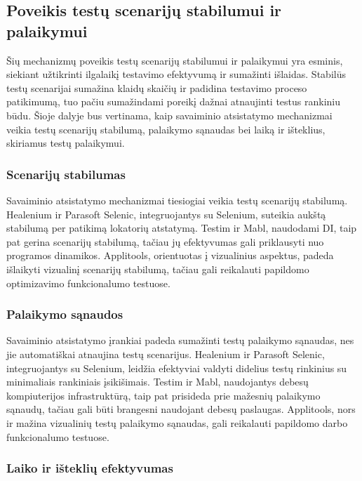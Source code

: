 \documentclass[
]{VUMIFPSkursinis}
\begin{document}
\subsection{Poveikis testų scenarijų stabilumui ir palaikymui}

Šių mechanizmų poveikis testų scenarijų stabilumui ir palaikymui yra esminis, siekiant užtikrinti ilgalaikį testavimo efektyvumą ir sumažinti išlaidas. Stabilūs testų scenarijai sumažina klaidų skaičių ir padidina testavimo proceso patikimumą, tuo pačiu sumažindami poreikį dažnai atnaujinti testus rankiniu būdu. Šioje dalyje bus vertinama, kaip savaiminio atsistatymo mechanizmai veikia testų scenarijų stabilumą, palaikymo sąnaudas bei laiką ir išteklius, skiriamus testų palaikymui.

\subsubsection{Scenarijų stabilumas}

Savaiminio atsistatymo mechanizmai tiesiogiai veikia testų scenarijų stabilumą. Healenium ir Parasoft Selenic, integruojantys su Selenium, suteikia aukštą stabilumą per patikimą lokatorių atstatymą. Testim ir Mabl, naudodami DI, taip pat gerina scenarijų stabilumą, tačiau jų efektyvumas gali priklausyti nuo programos dinamikos. Applitools, orientuotas į vizualinius aspektus, padeda išlaikyti vizualinį scenarijų stabilumą, tačiau gali reikalauti papildomo optimizavimo funkcionalumo testuose.

\subsubsection{Palaikymo sąnaudos}

Savaiminio atsistatymo įrankiai padeda sumažinti testų palaikymo sąnaudas, nes jie automatiškai atnaujina testų scenarijus. Healenium ir Parasoft Selenic, integruojantys su Selenium, leidžia efektyviai valdyti didelius testų rinkinius su minimaliais rankiniais įsikišimais. Testim ir Mabl, naudojantys debesų kompiuterijos infrastruktūrą, taip pat prisideda prie mažesnių palaikymo sąnaudų, tačiau gali būti brangesni naudojant debesų paslaugas. Applitools, nors ir mažina vizualinių testų palaikymo sąnaudas, gali reikalauti papildomo darbo funkcionalumo testuose.

\subsubsection{Laiko ir išteklių efektyvumas}
\end{document}
